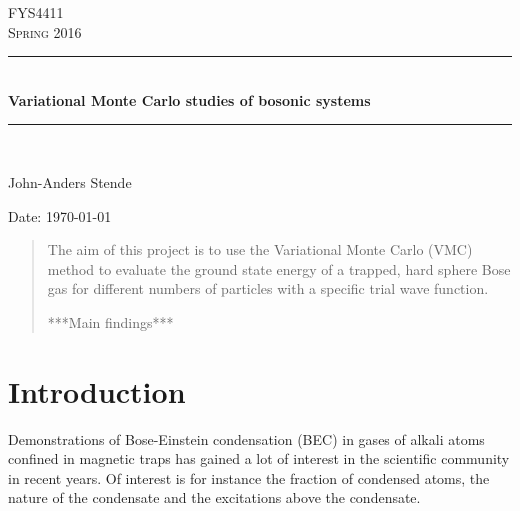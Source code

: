 \documentclass[english, a4paper]{article}
\begin{document}
\renewcommand{\figurename}{Figure}
\begin{titlepage}
\begin{center}

\textsc{\Large FYS4411}\\[0.5cm]
\textsc{\Large Spring 2016}\\[1.5cm]
\rule{\linewidth}{0.5mm} \\[0.4cm]
{ \huge \bfseries Variational Monte Carlo studies of bosonic systems}\\[0.10cm]
\rule{\linewidth}{0.5mm} \\[1.5cm]

\begin{minipage}{0.49\textwidth}
    \begin{center} \large
        John-Anders Stende \\[0.8cm]
    \end{center}
\end{minipage}


\vfill

\large{Date: \today}

\end{center}
\end{titlepage}


\begin{abstract}
The aim of this project is to use the Variational Monte Carlo (VMC) method to evaluate the 
ground state energy of a trapped, hard sphere Bose gas for different numbers of particles
with a specific trial wave function. 

***Main findings***
\end{abstract}

\tableofcontents


\section{Introduction}
Demonstrations of Bose-Einstein condensation (BEC) in gases of alkali atoms confined in magnetic traps has gained
a lot of interest in the scientific community in recent years. Of interest is for instance the fraction of condensed atoms, 
the nature of the condensate and the excitations above the condensate. \\
\end{document}
